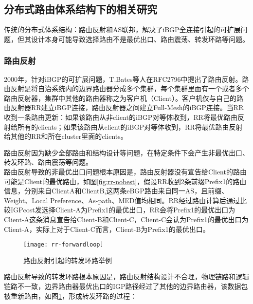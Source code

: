 \subsection{分布式路由体系结构下的相关研究}
传统的分布式体系结构：路由反射和AS联邦，解决了iBGP全连接引起的可扩展问题，但其设计本身可能导致选择路由不是最优出口、路由震荡、转发环路等问题。

\subsubsection{路由反射\cite{rfc2796}}
\label{subsubsec:rr}
2000年，针对iBGP的可扩展问题，T.Bates等人在RFC2796\cite{rfc2796}中提出了路由反射。路由反射是将自治系统内的边界路由器分成多个集群，每个集群里面有一个或者多个路由反射器，集群中其他的路由器称之为客户机（Client）。客户机仅与自己的路由反射器RR建立iBGP连接，路由反射器之间建立Full-Mesh的iBGP连接。当RR收到一条路由更新：如果该路由从非client的iBGP对等体收到，RR将最优路由反射给所有的clients；如果该路由从client的iBGP对等体收到，RR将最优路由反射给其他的RR和所在cluster里面的clients。



路由反射因为缺少全部路由和结构设计等问题，在特定条件下会产生非最优出口、转发环路、路由震荡等问题。\\


路由反射导致的非最优出口问题根本原因是，路由反射器没有宣告给Client的路由可能是Client的最优路由，如图\ref{fig:rr-nobest}，假设RR收到2条前缀Prefix1的路由信息，分别来自ClientA和ClientB,这两条eBGP路由来自同一AS，且前缀、Weight、Local Preference、As-path、MED值均相同。RR经过路由计算后通过比较IGPcost发选择Client-A为Prefix1的最优出口，RR会将Prefix1的最优出口为Client-A这条消息宣告给Client-B和Client-C，Client-C会认为Prefix1的最优出口为Client-A，实际上对于Client-C而言，Client-B为Prefix1的最优出口。\\

\begin{figure}
  \centering
  \texttt{[image: rr-forwardloop]}
  \caption{路由反射引起的转发环路举例}
  \label{fig:rr-forwardloop}
\end{figure}



路由反射导致的转发环路\cite{Dube1999A}根本原因是，路由反射结构设计不合理，物理链路和逻辑链路不一致，边界路由器最优出口的IGP路径经过了其他的边界路由器，该数据包被重新路由，如图\ref{fig:rr-forwardloop}，形成转发环路的过程：

